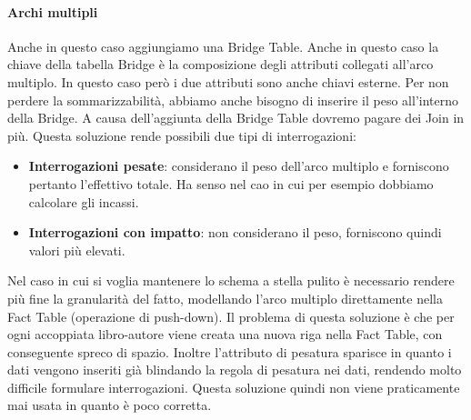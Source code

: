 \paragraph{Archi multipli}
Anche in questo caso aggiungiamo una Bridge Table. Anche in questo caso la chiave della tabella Bridge è la composizione degli attributi collegati all'arco multiplo.\newline
In questo caso però i due attributi sono anche chiavi esterne. Per non perdere la sommarizzabilità, abbiamo anche bisogno di inserire il peso all'interno della Bridge.
\noindent A causa dell'aggiunta della Bridge Table dovremo pagare dei Join in più. Questa soluzione rende possibili due tipi di interrogazioni:
\begin{itemize}
	\item \textbf{Interrogazioni pesate}: considerano il peso dell'arco multiplo e forniscono pertanto l'effettivo totale. Ha senso nel cao in cui per esempio dobbiamo calcolare gli incassi.
	\item \textbf{Interrogazioni con impatto}: non considerano il peso, forniscono quindi valori più elevati.
\end{itemize}
\noindent Nel caso in cui si voglia mantenere lo schema a stella pulito è necessario rendere più fine la granularità del fatto, modellando l'arco multiplo direttamente nella Fact Table (operazione di push-down).
\noindent Il problema di questa soluzione è che per ogni accoppiata libro-autore viene creata una nuova riga nella Fact Table, con conseguente spreco di spazio. Inoltre l'attributo di pesatura sparisce in quanto i dati vengono inseriti già blindando la regola di pesatura nei dati, rendendo molto difficile formulare interrogazioni.\newline
Questa soluzione quindi non viene praticamente mai usata in quanto è poco corretta.
